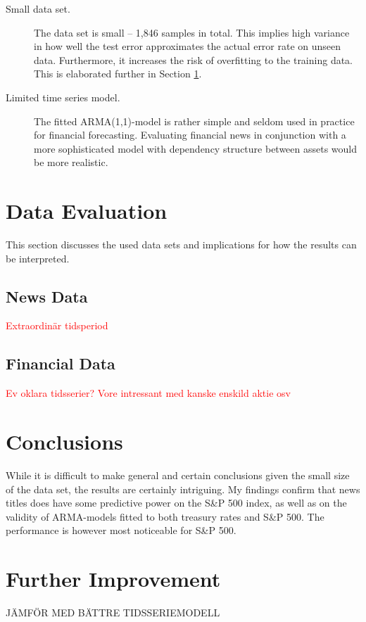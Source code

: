 \begin{description}
    \item[Small data set.] The data set is small -- 1,846 samples in total. This implies high variance in how well the test error approximates the actual error rate on unseen data. Furthermore, it increases the risk of overfitting to the training data. This is elaborated further in Section \ref{sec:disc_data}.
    \item[Limited time series model.] The fitted ARMA(1,1)-model is rather simple and seldom used in practice for financial forecasting. Evaluating financial news in conjunction with a more sophisticated model with dependency structure between assets would be more realistic. 
\end{description}



\section{Data Evaluation}\label{sec:disc_data}
This section discusses the used data sets and implications for how the results can be interpreted. 

\subsection{News Data}
\textcolor{red}{Extraordinär tidsperiod}

\subsection{Financial Data}
\textcolor{red}{Ev oklara tidsserier? Vore intressant med kanske enskild aktie osv }

\section{Conclusions}

While it is difficult to make general and certain conclusions given the small size of the data set, the results are certainly intriguing. My findings confirm that news titles does have some predictive power on the S\&P 500 index, as well as on the validity of ARMA-models fitted to both treasury rates and S\&P 500. The performance is however most noticeable for S\&P 500. 

\section{Further Improvement}

JÄMFÖR MED BÄTTRE TIDSSERIEMODELL 
